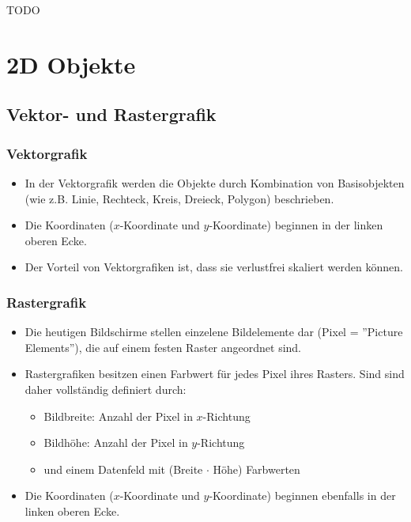 \documentclass{scrartcl}
\begin{document}
TODO

\section{2D Objekte}

\subsection{Vektor- und Rastergrafik}

\subsubsection{Vektorgrafik}

\begin{itemize}
	\item In der Vektorgrafik werden die Objekte durch Kombination von Basisobjekten (wie z.B. Linie, Rechteck, Kreis, Dreieck, Polygon) beschrieben.
	\item  Die Koordinaten ($x$-Koordinate und $y$-Koordinate) beginnen in der linken oberen Ecke.
	\item  Der Vorteil von Vektorgrafiken ist, dass sie verlustfrei skaliert werden können.
\end{itemize}

\subsubsection{Rastergrafik}

\begin{itemize}
	\item Die heutigen Bildschirme stellen einzelene Bildelemente dar (Pixel = ''Picture Elements''), die auf einem festen Raster angeordnet sind.
	\item Rastergrafiken besitzen einen Farbwert für jedes Pixel ihres Rasters. Sind sind daher vollständig definiert durch:
	\begin{itemize}
		\item Bildbreite: Anzahl der Pixel in $x$-Richtung
		\item Bildhöhe: Anzahl der Pixel in $y$-Richtung
		\item und einem Datenfeld mit (Breite $\cdot$ Höhe) Farbwerten
	\end{itemize}
	\item  Die Koordinaten ($x$-Koordinate und $y$-Koordinate) beginnen ebenfalls in der linken oberen Ecke.
\end{itemize}
\end{document}

